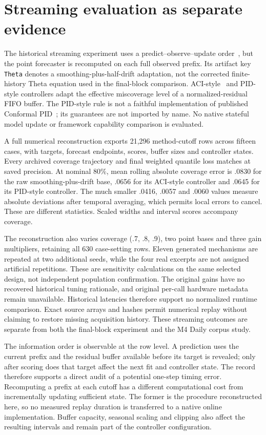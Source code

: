\documentclass[11pt,a4paper]{article}
\begin{document}
\section{Streaming evaluation as separate evidence}
\label{sec:streaming-evidence}
The historical streaming experiment uses a predict--observe--update order~\cite{dawid}, but the point forecaster is recomputed on each full observed prefix. Its artifact key \texttt{Theta} denotes a smoothing-plus-half-drift adaptation, not the corrected finite-history Theta equation used in the final-block comparison. ACI-style~\cite{aci} and PID-style controllers adapt the effective miscoverage level of a normalized-residual FIFO buffer. The PID-style rule is not a faithful implementation of published Conformal PID~\cite{pid}; its guarantees are not imported by name. No native stateful model update or framework capability comparison is evaluated.

A full numerical reconstruction exports 21,296 method-cutoff rows across fifteen cases, with targets, forecast endpoints, scores, buffer sizes and controller states. Every archived coverage trajectory and final weighted quantile loss matches at saved precision. At nominal 80\%, mean rolling absolute coverage error is .0830 for the raw smoothing-plus-drift base, .0656 for its ACI-style controller and .0645 for its PID-style controller. The much smaller .0416, .0057 and .0060 values measure absolute deviations after temporal averaging, which permits local errors to cancel. These are different statistics. Scaled widths and interval scores accompany coverage.

The reconstruction also varies coverage (.7, .8, .9), two point bases and three gain multipliers, retaining all 630 case-setting rows. Eleven generated mechanisms are repeated at two additional seeds, while the four real excerpts are not assigned artificial repetitions. These are sensitivity calculations on the same selected design, not independent population confirmation. The original gains have no recovered historical tuning rationale, and original per-call hardware metadata remain unavailable. Historical latencies therefore support no normalized runtime comparison. Exact source arrays and hashes permit numerical replay without claiming to restore missing acquisition history. These streaming outcomes are separate from both the final-block experiment and the M4 Daily corpus study.

The information order is observable at the row level. A prediction uses the current prefix and the residual buffer available before its target is revealed; only after scoring does that target affect the next fit and controller state. The record therefore supports a direct audit of a potential one-step timing error. Recomputing a prefix at each cutoff has a different computational cost from incrementally updating sufficient state. The former is the procedure reconstructed here, so no measured replay duration is transferred to a native online implementation. Buffer capacity, seasonal scaling and clipping also affect the resulting intervals and remain part of the controller configuration.
\end{document}

